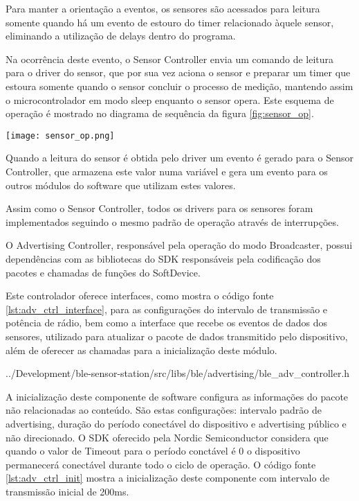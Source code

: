 Para manter a orientação a eventos, os sensores são acessados para
leitura somente quando há um evento de estouro do timer relacionado àquele
sensor, eliminando a utilização de delays dentro do programa. 

Na ocorrência deste evento, o Sensor Controller envia um comando de
leitura para o driver do sensor, que por sua vez aciona o sensor e
preparar um timer que estoura somente quando o sensor concluir o processo
de medição, mantendo assim o microcontrolador em modo sleep enquanto o sensor
opera. Este esquema de operação é mostrado no diagrama de sequência da figura
\ref{fig:sensor_op}.

\begin{center}
	\centering 
	\texttt{[image: sensor\_op.png]}
	\label{fig:sensor_op}
\end{center} 

Quando a leitura do sensor é obtida pelo driver um evento é gerado para o Sensor
Controller, que armazena este valor numa variável e gera um evento para os
outros módulos do software que utilizam estes valores.

Assim como o Sensor Controller, todos os drivers para os sensores foram
implementados seguindo o mesmo padrão de operação através de interrupções.


O Advertising Controller, responsável pela operação do modo Broadcaster, possui
dependências com as bibliotecas do SDK responsáveis pela codificação dos pacotes
e chamadas de funções do SoftDevice.

Este controlador oferece interfaces, como mostra o código fonte
\ref{lst:adv_ctrl_interface}, para as configurações do intervalo de transmissão
e potência de rádio, bem como a interface que recebe os eventos de dados dos
sensores, utilizado para atualizar o pacote de dados transmitido pelo
dispositivo, além de oferecer as chamadas para a inicialização deste módulo.

\begin{minipage}{0.95\linewidth} 
 
{../Development/ble-sensor-station/src/libs/ble/advertising/ble_adv_controller.h}
\end{minipage}

A inicialização deste componente de software configura as informações do pacote
não relacionadas ao conteúdo. São estas configurações: intervalo padrão de
advertising, duração do período conectável do dispositivo e advertising público
e não direcionado. O SDK oferecido pela Nordic Semiconductor considera que
quando o valor de Timeout para o período conctável é 0 o dispositivo permanecerá
conectável durante todo o ciclo de operação\cite{nrf51sdkManual}. O código fonte
\ref{lst:adv_ctrl_init} mostra a inicialização deste componente com intervalo de
transmissão inicial de 200ms.

